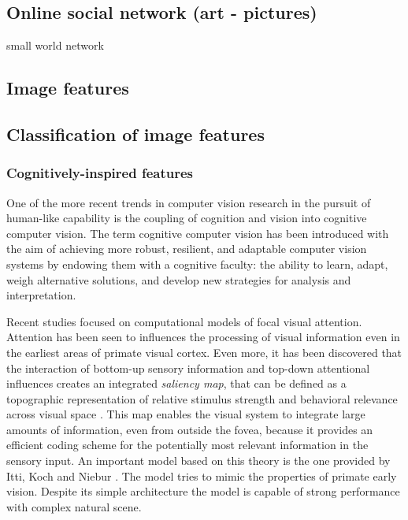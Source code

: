 \subsection{Online social network (art - pictures)}
small world network
\subsection{Image features}
\subsection{Classification of image features}

\subsubsection{Cognitively-inspired features}
One of the more recent trends in computer vision research in the pursuit of human-like capability is the coupling of cognition and vision into cognitive computer vision. The term cognitive computer vision has been introduced with the aim of achieving more robust, resilient, and adaptable computer vision systems by endowing them with a cognitive faculty: the ability to learn, adapt, weigh alternative solutions, and develop new strategies for analysis and interpretation.

Recent studies focused on computational models of focal visual attention. Attention has been seen to influences the processing of visual information even in the earliest areas of primate visual cortex. Even more, it has been discovered that the interaction of bottom-up sensory information and top-down attentional influences creates an integrated \textit{saliency map}, that can be defined as a topographic representation of relative stimulus strength and behavioral relevance across visual space \cite{Saliency_WWHW}. This map enables the visual system to integrate large amounts of information, even from outside the fovea, because it provides an efficient coding scheme for the potentially most relevant information in the sensory input.
An important model based on this theory is the one provided by Itti, Koch and Niebur \cite{Itti_review, Itti_model}. The model tries to mimic the properties of primate early vision. Despite its simple architecture the model is capable of strong performance with complex natural scene. 